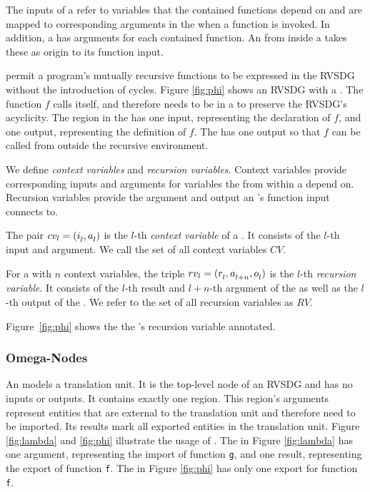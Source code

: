 The inputs of a \phinode refer to variables that the contained functions depend on and are mapped
to corresponding arguments in the \phiregion when a function is invoked. In addition, a
\phiregion has arguments for each contained function. An \applynode from
inside a \phiregion takes these as origin to its function input.

\phinodes permit a program's mutually recursive functions to be expressed in the RVSDG
without the introduction of cycles. Figure \ref{fig:phi} shows an RVSDG with a \phinode.
The function $f$ calls itself, and therefore needs to be in a \phinode to preserve the RVSDG's
acyclicity. The region in the \phinode has one input, representing the declaration of $f$, and
one output, representing the definition of $f$. The \phinode has one output so that $f$ can
be called from outside the recursive environment.

We define \emph{context variables} and \emph{recursion variables}. Context variables
provide corresponding inputs and arguments for variables the \lambdanodes from within a \phiregion
depend on. Recursion variables provide the argument and output an \applynode's function
input connects to.

\begin{definition}
The pair $cv_{l} = (\mbox{$i_{l}^{}$}, \mbox{$a_{l}^{}$})$ is the $l$-th \emph{context variable} of a
\phinode. It consists of the $l$-th input and argument. We call the set of all context variables
$CV$.
\end{definition}

\begin{definition}
For a \phinode with $n$ context variables, the triple $rv_{l} = (\mbox{$r_{l}^{}$}, \mbox{$a_{l+n}^{}$},
\mbox{$o_{l}^{}$})$ is the $l$-th \emph{recursion variable}. It consists of the $l$-th result and
$l+n$-th argument of the \phiregion as well as the $l$-th output of the \phinode. We refer to the
set of all recursion variables as $RV$.
\end{definition}

Figure~\ref{fig:phi} shows the the \phinode's recursion variable annotated.

\subsubsection{Omega-Nodes}
An \omeganode models a translation unit. It is the top-level node of an
RVSDG and has no inputs or outputs. It contains exactly one region. This region's
arguments represent entities that are external to the translation unit and therefore need to be
imported. Its results mark all exported entities in the translation unit. Figure
\ref{fig:lambda} and \ref{fig:phi} illustrate the usage of \omeganodes. The \omegaregion in Figure
\ref{fig:lambda} has one argument, representing the import of function \verb;g;, and one result,
representing the export of function \verb;f;. The \omegaregion in Figure \ref{fig:phi} has only
one export for function \verb;f;.

